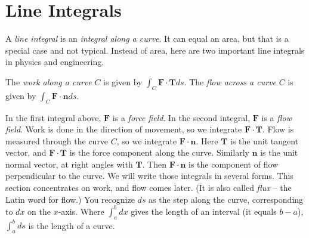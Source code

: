 \section{Line Integrals}\label{sec:line_integrals}
A \emph{line integral} is an \emph{integral along a curve}. It can equal an area, but that is a special
case and not typical. Instead of area, here are two important line integrals in physics and engineering.

{The \emph{work along a curve} $C$ is given by $\int_C \mathbf{F}\cdot \mathbf{T} ds$. The \emph{flow across a curve} $C$ is given by $\int_C \mathbf{F}\cdot \mathbf{n} ds$.}

In the first integral above, $\mathbf{F}$ is a \emph{force field}. In the second integral, $\mathbf{F}$ is a \emph{flow field}. Work
is done in the direction of movement, so we integrate $\mathbf{F}\cdot \mathbf{T}$. Flow is measured through
the curve $C$, so we integrate $\mathbf{F}\cdot \mathbf{n}$. Here $\mathbf{T}$ is the unit tangent vector, and $\mathbf{F}\cdot \mathbf{T}$ is the
force component along the curve. Similarly $\mathbf{n}$ is the unit normal vector, at right angles with $\mathbf{T}$. Then $\mathbf{F}\cdot \mathbf{n}$ is the component of flow perpendicular to the curve.
We will write those integrals in several forms. This section concentrates on work, and flow comes later. (It is also called \emph{flux} -- the Latin word for flow.) You recognize $ds$
as the step along the curve, corresponding to $dx$ on the $x$-axis. Where $\int_a^b dx$ gives the
length of an interval (it equals $b - a$), $\int_a^b ds$ is the length of a curve.

